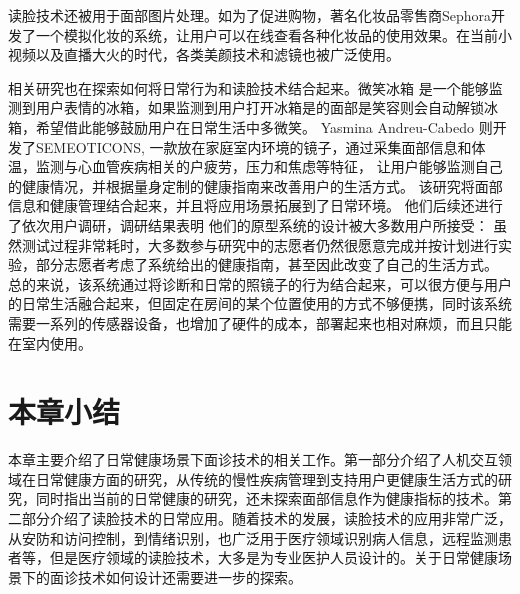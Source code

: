 读脸技术还被用于面部图片处理。如为了促进购物，著名化妆品零售商Sephora开发了一个模拟化妆的系统，让用户可以在线查看各种化妆品的使用效果\cite{Sephora}。在当前小视频以及直播大火的时代，各类美颜技术和滤镜也被广泛使用。

相关研究也在探索如何将日常行为和读脸技术结合起来。微笑冰箱\cite{Tsujita2011Smiling} 是一个能够监测到用户表情的冰箱，如果监测到用户打开冰箱是的面部是笑容则会自动解锁冰箱，希望借此能够鼓励用户在日常生活中多微笑。 Yasmina Andreu-Cabedo  \cite{andreu2015mirror}则开发了SEMEOTICONS, 一款放在家庭室内环境的镜子，通过采集面部信息和体温，监测与心血管疾病相关的户疲劳，压力和焦虑等特征， 让用户能够监测自己的健康情况，并根据量身定制的健康指南来改善用户的生活方式。
 该研究将面部信息和健康管理结合起来，并且将应用场景拓展到了日常环境。
 他们后续还进行了依次用户调研，调研结果表明\cite{coppini2017user} 他们的原型系统的设计被大多数用户所接受： 虽然测试过程非常耗时，大多数参与研究中的志愿者仍然很愿意完成并按计划进行实验，部分志愿者考虑了系统给出的健康指南，甚至因此改变了自己的生活方式。
总的来说，该系统通过将诊断和日常的照镜子的行为结合起来，可以很方便与用户的日常生活融合起来，但固定在房间的某个位置使用的方式不够便携，同时该系统需要一系列的传感器设备，也增加了硬件的成本，部署起来也相对麻烦，而且只能在室内使用。

\section{本章小结}
本章主要介绍了日常健康场景下面诊技术的相关工作。第一部分介绍了人机交互领域在日常健康方面的研究，从传统的慢性疾病管理到支持用户更健康生活方式的研究，同时指出当前的日常健康的研究，还未探索面部信息作为健康指标的技术。第二部分介绍了读脸技术的日常应用。随着技术的发展，读脸技术的应用非常广泛，从安防和访问控制，到情绪识别，也广泛用于医疗领域识别病人信息，远程监测患者等，但是医疗领域的读脸技术，大多是为专业医护人员设计的。关于日常健康场景下的面诊技术如何设计还需要进一步的探索。